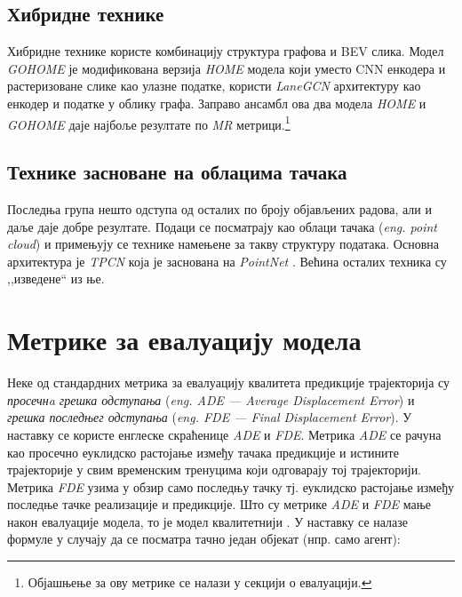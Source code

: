 \documentclass[11pt,oneside]{memoir}
\begin{document}
\section{Хибридне технике}

Хибридне технике користе комбинацију структура графова и BEV слика. Модел \textit{GOHOME} је модификована верзија \textit{HOME} 
модела који уместо CNN енкодера и растеризоване слике као улазне податке, користи \textit{LaneGCN} архитектуру као енкодер и податке
у облику графа. Заправо ансамбл ова два модела \textit{HOME} и \textit{GOHOME}
даје најбоље резултате по \textit{MR} метрици.\footnote{Објашњење за ову метрике се налази у секцији о евалуацији.}

\section{Технике засноване на облацима тачака}

Последња група нешто одступа од осталих по броју објављених радова, 
али и даље даје добре резултате. Подаци се посматрају као облаци тачака (\textit{eng. point cloud}) 
и примењују се технике намењене за такву структуру података. Основна
архитектура је \textit{TPCN} \cite{tpcn} која је заснована на \textit{PointNet} \cite{pointnet}. Већина осталих техника су ,,изведене`` из ње.


\chapter{Метрике за евалуацију модела}
\label{chp:razrada}

Неке од стандардних метрика за евалуацију квалитета предикције трајекторија су \textit{просечнa грешка одступања} (\textit{eng. ADE --- Average Displacement Error})
и \textit{грешка последњег одступања} (\textit{eng. FDE --- Final Displacement Error}). У наставку се користе енглеске скраћенице \textit{ADE} и
\textit{FDE}. Метрика \textit{ADE} се рачуна као просечно еуклидско растојање између тачака предикције и истините трајекторије у свим
временским тренуцима који одговарају тој трајекторији. 
Метрика \textit{FDE} узима у обзир само последњу тачку тј. еуклидско растојање између последње тачке реализације и предикције.
Што су метрике \textit{ADE} и \textit{FDE} мање након евалуације модела, то је модел квалитетнији \cite{argoverse, social_gan}.  
У наставку се налазе формуле у случају да се посматра тачно један објекат (нпр. само агент):
\end{document}
